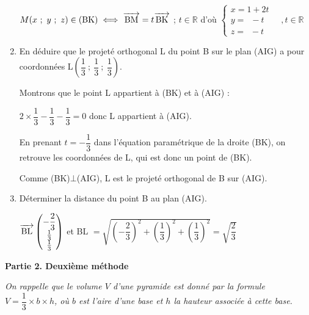 \documentclass[11pt]{article}
\newcommand{\R}{\mathbb{R}}
\newcommand{\vect}[1]{\overrightarrow{\,\mathstrut#1\,}}
\begin{document}
\begin{enumerate}
$M(x~;~y~;~z) \in (\text{BK}) \iff \vect{\text{BM}}=t\vect{\text{BK}}$ ; $t \in \R$ d'où $\begin{cases} x=1+2t\\y=\phantom{1}-t\\z=\phantom{1}-t\end{cases} \quad ,t\in \R $
\item En déduire que le projeté orthogonal L du point B sur le plan (AIG) a pour
coordonnées L$\left(\dfrac{1}{3}~;~\dfrac{1}{3}~;~\dfrac{1}{3}\right)$.

Montrons que le point L appartient à (BK) et à (AIG) :

$2\times \dfrac{1}{3}-\dfrac{1}{3}-\dfrac{1}{3}=0$ donc L appartient à (AIG).

En prenant $t=-\dfrac{1}{3}$ dans l'équation paramétrique de la droite (BK), on retrouve les coordonnées de L, qui est donc un point de (BK).

Comme (BK)$\bot$(AIG), L est le projeté orthogonal de B sur (AIG).

\item Déterminer la distance du point B au plan (AIG).

$\vect{\text{BL}}\begin{pmatrix}
-\dfrac{2}{3}\\ \frac{1}{3}\\ \frac{1}{3}
\end{pmatrix} $ et BL $=\sqrt{\left(-\dfrac{2}{3}\right)^2+\left(\dfrac{1}{3}\right)^2+\left(\dfrac{1}{3}\right)^2}=\sqrt{\dfrac{2}{3}}$
\end{enumerate}

\bigskip

\textbf{Partie 2. Deuxième méthode}

\medskip

\emph{On rappelle que le volume $V$ d'une pyramide est donné par la formule $V = \dfrac{1}{3} \times  b \times h$, où $b$ est l'aire d'une base et $h$ la hauteur associée à cette base.}

\medskip
\end{document}
